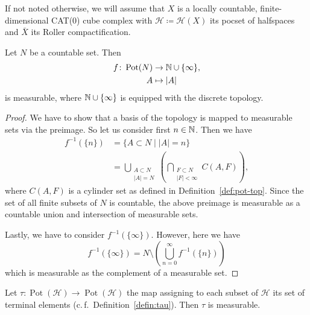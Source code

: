 If not noted otherwise, we will assume that \(X\) is a locally countable, finite-dimensional CAT(0) cube complex with \(\mathcal{H} \coloneqq \mathcal{H}(X)\) its pocset of halfspaces and \(\bar X\) its Roller compactification.

\begin{lemma}
  \label{lem:measurable-countable}
  Let \(N\) be a countable set. Then
  \begin{align*}
    f\colon \operatorname{Pot}(N) &\to \mathbb{N} \cup \{\infty\},\\
    A &\mapsto |A|
  \end{align*}
  is measurable, where \(\mathbb{N} \cup \{\infty\}\) is equipped with the discrete topology.
\end{lemma}

\begin{proof}
  We have to show that a basis of the topology is mapped to measurable sets via the preimage. So let us consider first \(n \in \mathbb{N}\). Then we have
  \begin{align*}
    f^{-1}(\{n\})
    & = \{ A \subset N \mid |A| = n\}\\
    & = \bigcup_{\substack{A \subset N\\|A| = N}} \left ( \bigcap_{\substack{F \subset N\\|F|< \infty}}C(A,F)\right),
  \end{align*}
  where \(C(A,F)\) is a cylinder set as defined in Definition~\ref{def:pot-top}. Since the set of all finite subsets of \(N\) is countable, the above preimage is measurable as a countable union and intersection of measurable sets.

  Lastly, we have to consider \(f^{-1}(\{\infty\})\). However, here we have
  \[
    f^{-1}(\{\infty\}) = N \setminus \left (\bigcup_{n=0}^\infty f^{-1}(\{n\})\right)
  \]
  which is measurable as the complement of a measurable set.
\end{proof}

\begin{lemma}
  \label{lem:tau}
   Let \(\tau\colon \operatorname{Pot}(\mathcal{H}) \to \operatorname{Pot}(\mathcal{H})\) the map assigning to each subset of \(\mathcal{H}\) its set of terminal elements (c.\,f.~Definition~\ref{defin:tau}). Then \(\tau\) is measurable.
\end{lemma}

